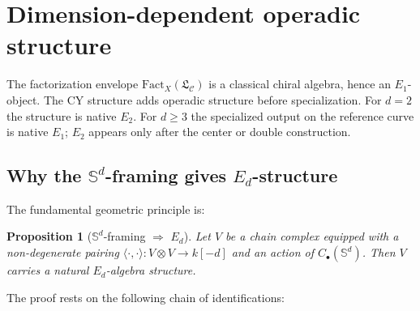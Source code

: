 \documentclass[11pt]{article}
\theoremstyle{plain}
\newtheorem{proposition}[theorem]{Proposition}
\theoremstyle{definition}
\theoremstyle{remark}
\newcommand{\Eone}{E_1}
\newcommand{\Etwo}{E_2}
\newcommand{\Sd}{\mathbb{S}^d}
\newcommand{\Fact}{\mathrm{Fact}}
\newcommand{\cC}{\mathcal{C}}
\newcommand{\frakL}{\mathfrak{L}}
\begin{document}
\section{Dimension-dependent operadic structure}
\label{sec:step3}

The factorization envelope $\Fact_X(\frakL_\cC)$ is a
classical chiral algebra, hence an $\Eone$-object. The CY structure
adds operadic structure before specialization. For $d = 2$ the
structure is native $\Etwo$. For $d \geq 3$ the specialized output on
the reference curve is native $\Eone$; $\Etwo$ appears only after the
center or double construction.

\subsection{Why the $\Sd$-framing gives $E_d$-structure}
\label{sec:sd-gives-ed}

The fundamental geometric principle is:

\begin{proposition}[$\Sd$-framing $\Rightarrow$ $E_d$]
\label{prop:sd-ed}
Let $V$ be a chain complex equipped with a non-degenerate pairing $\langle \cdot, \cdot \rangle \colon V \otimes V \to k[-d]$ and an action of $C_\bullet(\Sd)$. Then $V$ carries a natural $E_d$-algebra structure.
\end{proposition}

The proof rests on the following chain of identifications:
\end{document}
